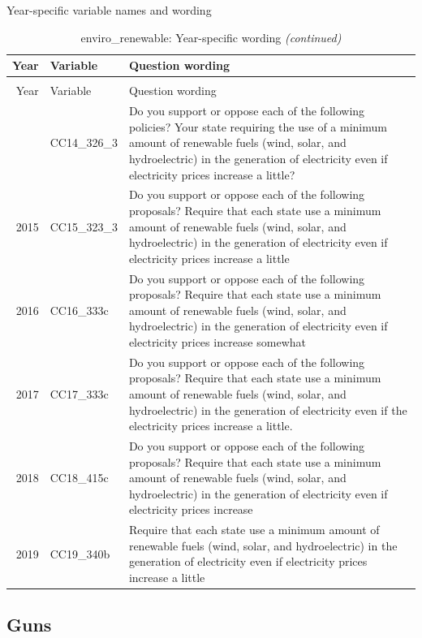 \documentclass[12pt]{article}
\begin{document}
\endgroup{}

Year-specific variable names and wording

\begin{longtable}[t]{rl>{\raggedright\arraybackslash}p{10cm}}
\caption{\label{tab:unnamed-chunk-4}enviro\_renewable: Year-specific wording}\\
\toprule
Year & Variable & Question wording\\
\midrule
\endfirsthead
\caption[]{enviro\_renewable: Year-specific wording \textit{(continued)}}\\
\toprule
Year & Variable & Question wording\\
\midrule
\endhead
\
\endfoot
\bottomrule
\endlastfoot
2014 & CC14\_326\_3 & Do you support or oppose each of the following policies? Your state requiring the use of a minimum amount of renewable fuels (wind, solar, and hydroelectric) in the generation of electricity even if electricity prices increase a little?\\
2015 & CC15\_323\_3 & Do you support or oppose each of the following proposals? Require that each state use a minimum amount of renewable fuels (wind, solar, and hydroelectric) in the generation of electricity even if electricity prices increase a little\\
2016 & CC16\_333c & Do you support or oppose each of the following proposals? Require that each state use a minimum amount of renewable fuels (wind, solar, and hydroelectric) in the generation of electricity even if electricity prices increase somewhat\\
2017 & CC17\_333c & Do you support or oppose each of the following proposals? Require that each state use a minimum amount of renewable fuels (wind, solar, and hydroelectric) in the generation of electricity even if the electricity prices increase a little.\\
2018 & CC18\_415c & Do you support or oppose each of the following proposals? Require that each state use a minimum amount of renewable fuels (wind, solar, and hydroelectric) in the generation of electricity even if electricity prices increase\\
2019 & CC19\_340b & Require that each state use a minimum amount of renewable fuels (wind, solar, and hydroelectric) in the generation of electricity even if electricity prices increase a little\\*
\end{longtable}\newpage

\subsection{Guns}\label{guns}
\end{document}
